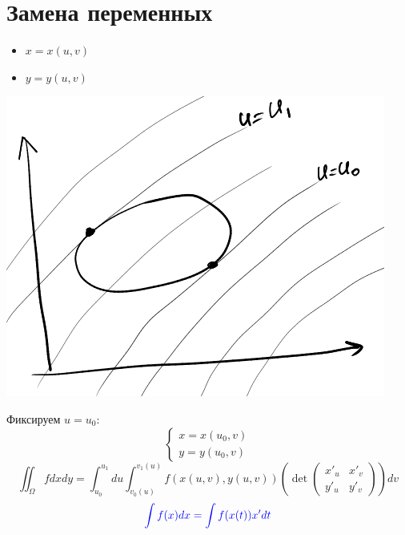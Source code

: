 \documentclass[english]{article}
\theoremstyle{plain}
\theoremstyle{remark}
\theoremstyle{definition}
\begin{document}
\section{Замена переменных}
\label{sec:org54d1cb7}
\begin{itemize}
\item \(x = x(u, v)\)
\item \(y = y(u, v)\)
\end{itemize}
\begin{center}
\includegraphics[scale=0.4]{3_6.png}
\end{center}
Фиксируем \(u = u_0\):
\[ \begin{cases}x = x(u_0, v) \\ y = y(u_0, v) \end{cases}\]
\[ \iint_\Omega f dx dy = \int_{u_0}^{u_1} du \int^{v_1(u)}_{v_0(u)} f(x(u, v), y(u, v)) \left(\det\begin{pmatrix}x'_u & x'_v \\ y'_u & y'_v \end{pmatrix}\right) dv \]
\[ \color{blue} \int f(x) dx = \int f(x(t)) x' dt \]
\end{document}
